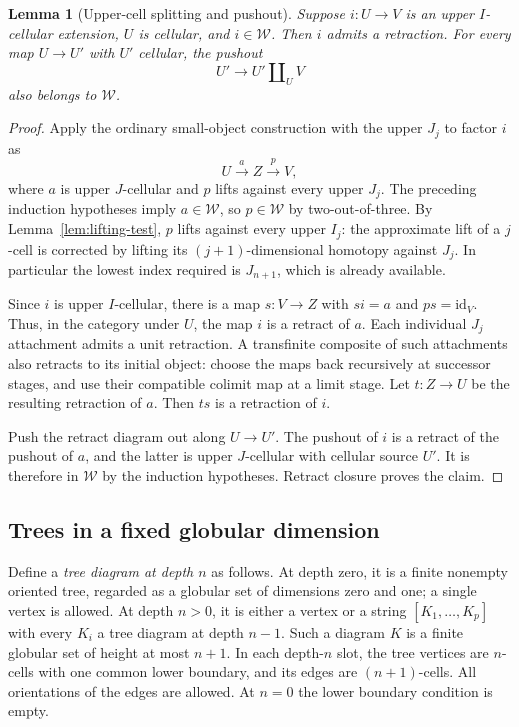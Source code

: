 \documentclass[11pt,letterpaper]{article}
\numberwithin{equation}{section}
\theoremstyle{plain}
\newtheorem{lemma}[theorem]{Lemma}
\theoremstyle{definition}
\theoremstyle{remark}
\begin{document}
\begin{lemma}[Upper-cell splitting and pushout]
\label{lem:upper-cell}
Suppose $i:U\to V$ is an upper $I$-cellular extension, $U$ is
cellular, and $i\in\mathcal W$.  Then $i$ admits a retraction.
For every map $U\to U'$ with $U'$ cellular, the pushout
\[
 U'\longrightarrow U'\amalg_U V
\]
also belongs to $\mathcal W$.
\end{lemma}

\begin{proof}
Apply the ordinary small-object construction with the upper
$J_j$ to factor $i$ as
\[
 U\xrightarrow{\,a\,}Z\xrightarrow{\,p\,}V,
\]
where $a$ is upper $J$-cellular and $p$ lifts against every upper
$J_j$.  The preceding induction hypotheses imply $a\in\mathcal W$,
so $p\in\mathcal W$ by two-out-of-three.  By
Lemma~\ref{lem:lifting-test}, $p$ lifts against every upper $I_j$:
the approximate lift of a $j$-cell is corrected by lifting its
$(j+1)$-dimensional homotopy against $J_j$.  In particular the
lowest index required is $J_{n+1}$, which is already available.

Since $i$ is upper $I$-cellular, there is a map $s:V\to Z$ with
$si=a$ and $ps=\mathrm{id}_V$.  Thus, in the category under $U$, the map
$i$ is a retract of $a$.
Each individual $J_j$ attachment admits a unit retraction.  A
transfinite composite of such attachments also retracts to its
initial object: choose the maps back recursively at successor
stages, and use their compatible colimit map at a limit stage.
Let $t:Z\to U$ be the resulting retraction of $a$.  Then $ts$ is
a retraction of $i$.

Push the retract diagram out along $U\to U'$.  The pushout of
$i$ is a retract of the pushout of $a$, and the latter is upper
$J$-cellular with cellular source $U'$.  It is therefore in
$\mathcal W$ by the induction hypotheses.  Retract closure proves
the claim.
\end{proof}

\subsection{Trees in a fixed globular dimension}

Define a \emph{tree diagram at depth $n$} as follows.  At depth zero,
it is a finite nonempty oriented tree, regarded as a globular set
of dimensions zero and one; a single vertex is allowed.  At
depth $n>0$, it is either a vertex or a string
$[K_1,\ldots,K_p]$ with every $K_i$ a tree diagram at depth $n-1$.
Such a diagram $K$ is a finite globular set of height at most
$n+1$.  In each depth-$n$ slot, the tree vertices are $n$-cells
with one common lower boundary, and its edges are $(n+1)$-cells.
All orientations of the edges are allowed.  At $n=0$ the lower
boundary condition is empty.
\end{document}
